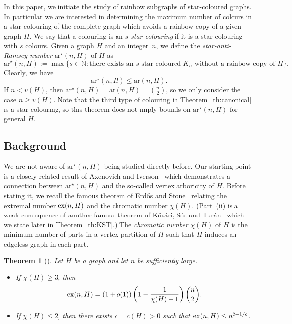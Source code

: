 \documentclass[a4paper, 12pt]{article}
\numberwithin{equation}{section}
\newtheorem{theorem}{Theorem}[section]
\def\ar{{\mathrm{ar}}}
\def\sar{{\mathrm{ar}^{\star}}}
\begin{document}
In this paper, we initiate the study of rainbow subgraphs of star-coloured graphs.
In particular we are interested in 
 determining the maximum number of colours in a star-colouring of the complete graph which avoids a rainbow copy of a given graph $H$.
We say that a colouring is an \emph{$s$-star-colouring} if it is a star-colouring with $s$ colours.
Given a graph $H$ and an integer~$n$, we define the \emph{star-anti-Ramsey number} $\sar(n,H)$ of $H$ as
$$
\sar(n,H) := \max\{s \in \mathbb{N}: \text{there exists an }s\text{-star-coloured }K_n\text{ without a rainbow copy of }H\}.
$$
Clearly, we have
\begin{equation}\label{eq:antiramsey}
\sar(n,H) \leq \ar(n,H).
\end{equation}
If $n < v(H)$, then $\sar(n,H)=\ar(n,H) = \binom{n}{2}$, so we only consider the case $n \geq v(H)$.
Note that the third type of colouring in Theorem~\ref{th:canonical} is a star-colouring, so this theorem does not imply bounds on $\sar(n,H)$ for general $H$.



\subsection{Background}\label{sec:background}

We are not aware of $\sar(n,H)$ being studied directly before.
Our starting point is a closely-related result of Axenovich and Iverson~\cite{AxenovichIverson} which demonstrates a connection between $\sar(n,H)$ and the so-called vertex arboricity of $H$.
Before stating it, we recall the famous theorem of Erd\H{o}s and Stone~\cite{ErdosStone} relating the extremal number ${\rm ex}(n,H)$ and the chromatic number $\chi(H)$. (Part~(ii) is a weak consequence of another famous theorem of K\H{o}v\'ari, S\'os and Tur\'an~\cite{KovariSosTuran} which we state later in Theorem~\ref{th:KST}.)
The \emph{chromatic number} $\chi(H)$ of $H$ is the minimum number of parts in a vertex partition of $H$ such that $H$ induces an %
edgeless graph in each part.

\begin{theorem} [\cite{ErdosStone, KovariSosTuran}]
Let $H$ be a graph and let $n$ be sufficiently large. 
\begin{itemize}
    \item[(i)]  If $\chi(H) \geq 3$, then
    $$
    {\rm ex}(n,H) = (1+o(1))\left(1-\frac{1}{\chi(H)-1}\right)\binom{n}{2}.
    $$
    \item[(ii)]  If $\chi(H) \leq 2$, then there exists $c=c(H)>0$ such that ${\rm ex}(n,H) \leq n^{2-1/c}$.
\end{itemize}
\end{theorem}
\end{document}
